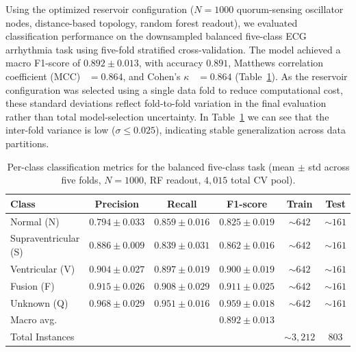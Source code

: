 \documentclass[journal=asbcd6,manuscript=article,keywords]{achemso}
\begin{document}
Using the optimized reservoir configuration ($N = 1000$ quorum-sensing oscillator nodes, distance-based topology, random forest readout), we evaluated classification performance on the downsampled balanced five-class ECG arrhythmia task using five-fold stratified cross-validation. 
The model achieved a macro F1-score of $0.892 \pm 0.013$, with accuracy $0.891$, Matthews correlation coefficient (MCC)~\cite{Matthews1975} $= 0.864$, and Cohen's $\kappa$~\cite{Cohen1960} $= 0.864$ (Table~\ref{tab:balanced-metrics}). 
As the reservoir configuration was selected using a single data fold to reduce computational cost, these standard deviations reflect fold-to-fold variation in the final evaluation rather than total model-selection uncertainty.
In Table~\ref{tab:balanced-metrics} we can see that the inter-fold variance is low ($\sigma \leq 0.025$), indicating stable generalization across data partitions. 

\begin{table}
    \centering
    \caption{Per-class classification metrics for the balanced five-class task (mean $\pm$ std across five folds, $N = 1000$, RF readout, $4{,}015$ total CV pool).}
    \label{tab:balanced-metrics}
    \small
    \begin{tabular}{lccccc}
        \toprule
        Class & Precision & Recall & F1-score & Train & Test \\
        \midrule
        Normal (N)     & $0.794 \pm 0.033$ & $0.859 \pm 0.016$ & $0.825 \pm 0.019$ & ${\sim}642$ & ${\sim}161$ \\
        Supraventricular (S) & $0.886 \pm 0.009$ & $0.839 \pm 0.031$ & $0.862 \pm 0.016$ & ${\sim}642$ & ${\sim}161$ \\
        Ventricular (V) & $0.904 \pm 0.027$ & $0.897 \pm 0.019$ & $0.900 \pm 0.019$ & ${\sim}642$ & ${\sim}161$ \\
        Fusion (F)     & $0.915 \pm 0.026$ & $0.908 \pm 0.029$ & $0.911 \pm 0.025$ & ${\sim}642$ & ${\sim}161$ \\
        Unknown (Q)    & $0.968 \pm 0.029$ & $0.951 \pm 0.016$ & $0.959 \pm 0.018$ & ${\sim}642$ & ${\sim}161$ \\
        \midrule
        Macro avg.     &       &        & $0.892 \pm 0.013$ & & \\
        Total Instances &       &        &                    & ${\sim}3{,}212$ & 803 \\
        \bottomrule
    \end{tabular}
\end{table}
\end{document}
